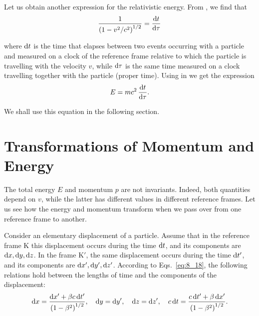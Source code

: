 Let us obtain another expression for the relativistic energy. From , we find that
\begin{equation}\label{eq:8_46}
	\frac{1}{\left(1 - v^2/c^2\right)^{1/2}} = \frac{\mathrm{d} t}{\mathrm{d}\tau}
\end{equation}

\noindent
where $\mathrm{d} t$ is the time that elapses between two events occurring with a particle and measured on a clock of the reference frame relative to which the particle is travelling with the velocity $v$, while $\mathrm{d}\tau$ is the same time measured on a clock travelling together with the particle (proper time). Using  in  we get the expression
\begin{equation}\label{eq:8_47}
	E = mc^2\,\frac{\mathrm{d} t}{\mathrm{d}\tau}.
\end{equation}

\noindent
We shall use this equation in the following section.

\section{Transformations of Momentum and Energy}\label{sec:8_8}

The total energy $E$ and momentum $p$ are not invariants. Indeed, both quantities depend on $v$, while the latter has different values in different reference frames. Let us see how the energy and momentum transform when we pass over from one reference frame to another.

Consider an elementary displacement of a particle. Assume that in the reference frame K this displacement occurs during the time $\mathrm{d} t$, and its components are $\mathrm{d} x, \mathrm{d} y, \mathrm{d} z$. In the frame K$'$, the same displacement occurs during the time $\mathrm{d} t'$, and its components are $\mathrm{d} x', \mathrm{d} y', \mathrm{d} z'$. According to Eqs.~\eqref{eq:8_18}, the following relations hold between the lengths of time and the components of the displacement:
\begin{equation*}
	\mathrm{d} x = \frac{\mathrm{d} x'+\beta c\,\mathrm{d} t'}{\left(1 - \beta^2\right)^{1/2}},\quad \mathrm{d} y=\mathrm{d} y',\quad \mathrm{d} z=\mathrm{d} z',\quad c\,\mathrm{d} t = \frac{c\,\mathrm{d} t'+\beta\,\mathrm{d} x'}{\left(1 - \beta^2\right)^{1/2}}.
\end{equation*}

